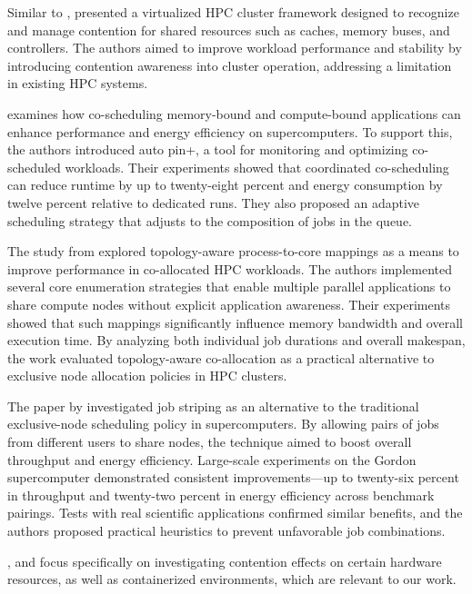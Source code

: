 Similar to \cite{10.1145/1958746.1958815},\cite{Blagodurov_2012} presented a virtualized HPC cluster framework designed to recognize and manage contention for shared resources such as caches, memory buses, and controllers. The authors aimed to improve workload performance and stability by introducing contention awareness into cluster operation, addressing a limitation in existing HPC systems.

\cite{7349920} examines how co-scheduling memory-bound and compute-bound applications can enhance performance and energy efficiency on supercomputers. To support this, the authors introduced auto pin+, a tool for monitoring and optimizing co-scheduled workloads. Their experiments showed that coordinated co-scheduling can reduce runtime by up to twenty-eight percent and energy consumption by twelve percent relative to dedicated runs. They also proposed an adaptive scheduling strategy that adjusts to the composition of jobs in the queue.

The study from \cite{10.1007/978-3-031-48803-0_31} explored topology-aware process-to-core mappings as a means to improve performance in co-allocated HPC workloads. The authors implemented several core enumeration strategies that enable multiple parallel applications to share compute nodes without explicit application awareness. Their experiments showed that such mappings significantly influence memory bandwidth and overall execution time. By analyzing both individual job durations and overall makespan, the work evaluated topology-aware co-allocation as a practical alternative to exclusive node allocation policies in HPC clusters.

The paper by \cite{10.1002/cpe.3187} investigated job striping as an alternative to the traditional exclusive-node scheduling policy in supercomputers. By allowing pairs of jobs from different users to share nodes, the technique aimed to boost overall throughput and energy efficiency. Large-scale experiments on the Gordon supercomputer demonstrated consistent improvements—up to twenty-six percent in throughput and twenty-two percent in energy efficiency across benchmark pairings. Tests with real scientific applications confirmed similar benefits, and the authors proposed practical heuristics to prevent unfavorable job combinations.

\cite{11044815}, \cite{8397647} and \cite{10501918} focus specifically on investigating contention effects on certain hardware resources, as well as containerized environments, which are relevant to our work.

